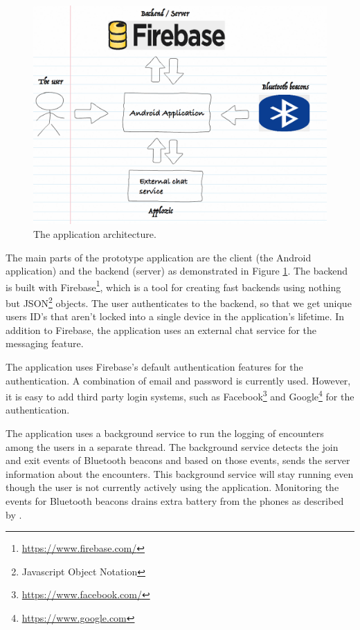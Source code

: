\begin{figure}[htb]
	\begin{center}
		\includegraphics[width=1\textwidth]{fs_architecture.png}
		\caption{The application architecture.}
		\label{fig:fs_architecture}
	\end{center}
\end{figure}

The main parts of the prototype application are the client (the Android application) and the backend (server) as demonstrated in Figure \ref{fig:fs_architecture}. The backend is built with Firebase\footnote{\url{https://www.firebase.com/}}, which is a tool for creating fast backends using nothing but JSON\footnote{Javascript Object Notation} objects. The user authenticates to the backend, so that we get unique users ID's that aren't locked into a single device in the application's lifetime. In addition to Firebase, the application uses an external chat service for the messaging feature.

The application uses Firebase's default authentication features for the authentication. A combination of email and password is currently used. However, it is easy to add third party login systems, such as Facebook\footnote{\url{https://www.facebook.com/}} and Google\footnote{\url{https://www.google.com}} for the authentication.

The application uses a background service to run the logging of encounters among the users in a separate thread. The background service detects the join and exit events of Bluetooth beacons and based on those events, sends the server information about the encounters. This background service will stay running even though the user is not currently actively using the application. Monitoring the events for Bluetooth beacons drains extra battery from the phones as described by \citep{bluetoothOverview}.

